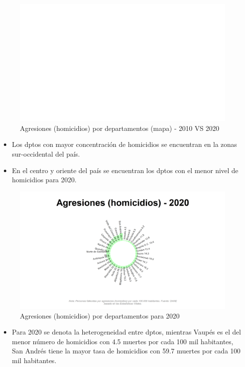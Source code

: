    \begin{figure}[H]
        \caption{Agresiones (homicidios) por departamentos (mapa) - 2010 VS 2020 \label{map_result_2} }
        \begin{center}
        \includegraphics[width=\textwidth,keepaspectratio]{img/var_286_map.png}
        \end{center}
    \end{figure}
            \begin{itemize}
                \item Los dptos con mayor concentración de homicidios se encuentran en la zonas sur-occidental del país.
                \item En el centro y oriente del país se encuentran los dptos con el menor nivel de homicidios para 2020.
                \end{itemize}

    \begin{figure}[H]
        \caption{Agresiones (homicidios) por departamentos para 2020 \label{map_result_2} }
        \begin{center}
        \includegraphics[width=\textwidth,keepaspectratio]{img/var_286_static.png}
        \end{center}
    \end{figure}
            \begin{itemize}
                \item Para 2020 se denota la heterogeneidad entre dptos, mientras Vaupés es el del menor número de homicidios con 4.5 muertes por cada 100 mil habitantes, San Andrés tiene la mayor tasa de homicidios con 59.7 muertes por cada 100 mil habitantes.
                \end{itemize}

